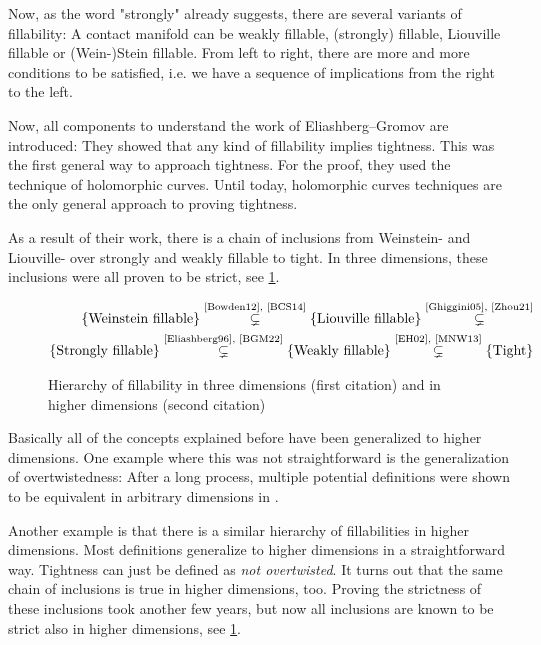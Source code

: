 Now, as the word "strongly" already suggests, there are several variants of fillability:
A contact manifold can be weakly fillable, (strongly) fillable, Liouville fillable or (Wein-)Stein fillable.
From left to right, there are more and more conditions to be satisfied, i.e. we have a sequence
of implications from the right to the left.

Now, all components to understand the work of Eliashberg--Gromov are introduced:
They showed that any kind of fillability implies tightness.
This was the first general way to approach tightness.
For the proof, they used the technique of holomorphic curves. Until today, holomorphic curves techniques are
the only general approach to proving tightness.

As a result of their work, there is a chain of inclusions from Weinstein- and Liouville- over strongly and weakly fillable to tight.
In three dimensions, these inclusions were all proven to be strict, see \cref{fig:fillability}.
\begin{figure}
    \begin{align*}
        \{\text{Weinstein fillable}\} \stackrel{\text{\cite{Bowden12}, \cite{BCS14}}}{\subsetneq} 
        \{\text{Liouville fillable}\} \stackrel{\text{\cite{Ghiggini05}, \cite{Zhou21}}}{\subsetneq}\\
        \{\text{Strongly  fillable}\} \stackrel{\text{\cite{Eliashberg96}, \cite{BGM22}}}{\subsetneq}
        \{\text{Weakly    fillable}\} \stackrel{\text{\cite{EH02}, \cite{MNW13}}}{\subsetneq}
        \{\text{Tight}\}
    \end{align*}
    \caption{Hierarchy of fillability in three dimensions (first citation) and in higher dimensions (second citation)}
    \label{fig:fillability}
\end{figure}

Basically all of the concepts explained before have been generalized to higher dimensions.
One example where this was not straightforward is the generalization of overtwistedness: 
After a long process, multiple potential definitions were shown to be equivalent in arbitrary dimensions in \cite{BEM15}.

Another example is that there is a similar hierarchy of fillabilities in higher dimensions. 
Most definitions generalize to higher dimensions in a straightforward way. Tightness can just be defined as \textit{not overtwisted}.
It turns out that the same chain of inclusions is true in higher dimensions, too.
Proving the strictness of these inclusions took another few years, but now all inclusions are known to be strict also in higher dimensions, 
see \cref{fig:fillability}.

